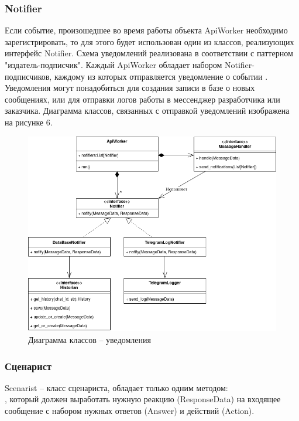     \subsubsection{Notifier}
    Если событие, произошедшее во время работы объекта ApiWorker необходимо
    зарегистрировать, то для этого будет использован один из классов,
    реализующих интерфейс Notifier.
    Схема уведомлений реализована в соответствии с паттерном "издатель-подписчик".
    Каждый ApiWorker обладает набором Notifier-подписчиков, каждому из которых
    отправляется уведомление о событии .
    Уведомления могут понадобиться для создания записи в базе о новых сообщениях,
    или для отправки логов работы в мессенджер разработчика или заказчика.
    Диаграмма классов, связанных с отправкой уведомлений изображена на рисунке 6.
    \begin{figure}[H]
        \centering
        \includegraphics[width=0.9\linewidth]{static/ClassDiagram_notifiers.png}
        \caption{Диаграмма классов -- уведомления}
        \label{fig:class-diagram-notifiers}
    \end{figure}


    \newpage
    \subsubsection{Сценарист}
    Scenarist -- класс сценариста, обладает только одним методом:\\
    , который должен
    выработать нужную реакцию (ResponseData) на входящее сообщение с
    набором нужных ответов (Answer) и действий (Action).

